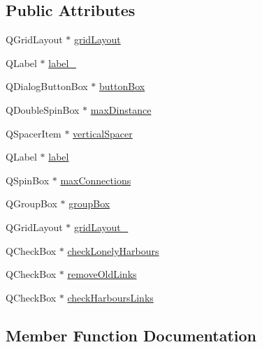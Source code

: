 \subsection*{Public Attributes}
\begin{DoxyCompactItemize}
\item 
Q\+Grid\+Layout $\ast$ \mbox{\hyperlink{class_ui___link_harbours_dialog_a6191bf8e70c4a9c7f5b613c588189034}{grid\+Layout}}
\item 
Q\+Label $\ast$ \mbox{\hyperlink{class_ui___link_harbours_dialog_a62695bd7a85c22d86a036ddb5da03241}{label\+\_}}
\item 
Q\+Dialog\+Button\+Box $\ast$ \mbox{\hyperlink{class_ui___link_harbours_dialog_a033c685e40b673c73e45fd1ca6560586}{button\+Box}}
\item 
Q\+Double\+Spin\+Box $\ast$ \mbox{\hyperlink{class_ui___link_harbours_dialog_a0d241f3c5126d02f4df6567ec0496374}{max\+Dinstance}}
\item 
Q\+Spacer\+Item $\ast$ \mbox{\hyperlink{class_ui___link_harbours_dialog_a06e201f60c0f1afdcbf84da1ec5a5eb7}{vertical\+Spacer}}
\item 
Q\+Label $\ast$ \mbox{\hyperlink{class_ui___link_harbours_dialog_a25c2cbfbe38e41ab22294450f4a69374}{label}}
\item 
Q\+Spin\+Box $\ast$ \mbox{\hyperlink{class_ui___link_harbours_dialog_ae7f6ff3f0fea45808181ce3996da7e6d}{max\+Connections}}
\item 
Q\+Group\+Box $\ast$ \mbox{\hyperlink{class_ui___link_harbours_dialog_abc9652d8586d011a363eac0b10ec3701}{group\+Box}}
\item 
Q\+Grid\+Layout $\ast$ \mbox{\hyperlink{class_ui___link_harbours_dialog_a051358a196f673a21960eaa7cb557372}{grid\+Layout\+\_}}
\item 
Q\+Check\+Box $\ast$ \mbox{\hyperlink{class_ui___link_harbours_dialog_a83243b473886f608ed6ffa7cf6535f17}{check\+Lonely\+Harbours}}
\item 
Q\+Check\+Box $\ast$ \mbox{\hyperlink{class_ui___link_harbours_dialog_a5085a975deb863aba81d34fee5b6fa98}{remove\+Old\+Links}}
\item 
Q\+Check\+Box $\ast$ \mbox{\hyperlink{class_ui___link_harbours_dialog_ae892363d24004368cbe9dd8b389d3503}{check\+Harbours\+Links}}
\end{DoxyCompactItemize}


\subsection{Member Function Documentation}
\mbox{\label{class_ui___link_harbours_dialog_a96bec6c00478178f58caf17db05a308c}} 
